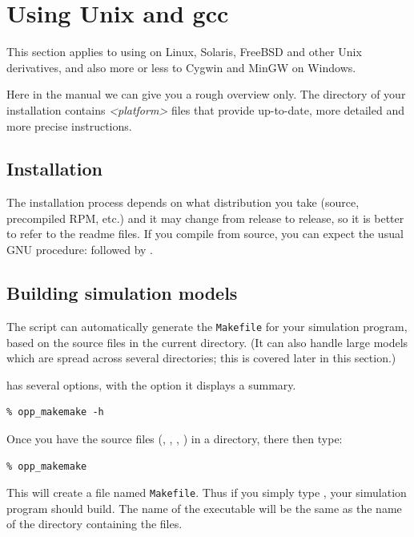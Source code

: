 \section{Using Unix and gcc}

This section applies to using {\opp} on Linux, Solaris, FreeBSD and
other Unix derivatives, and also more or less to Cygwin and MinGW
on Windows.

Here in the manual we can give you a rough overview only.
The  directory of your {\opp} installation contains
\textit{<platform>} files that provide
up-to-date, more detailed and more precise instructions.


\subsection{Installation}

The installation process depends on what distribution you take
(source, precompiled RPM, etc.) and it may change from release
to release, so it is better to refer to the readme files.
If you compile from source, you can expect the usual GNU
procedure:  followed by .


\subsection{Building simulation models}

The  script can automatically generate the
\texttt{Makefile} for your simulation program, based on the source files
in the current directory. (It can also handle large models
which are spread across several directories; this is covered later in
this section.)

 has several options, with the 
option it displays a summary.

\begin{verbatim}
% opp_makemake -h
\end{verbatim}

Once you have the source files (, , ,
) in a directory,  there then type:

\begin{verbatim}
% opp_makemake
\end{verbatim}

This will create a file named \texttt{Makefile}. Thus if you
simply type , your simulation program should build. The name of
the executable will be the same as the name of the directory
containing the files.


